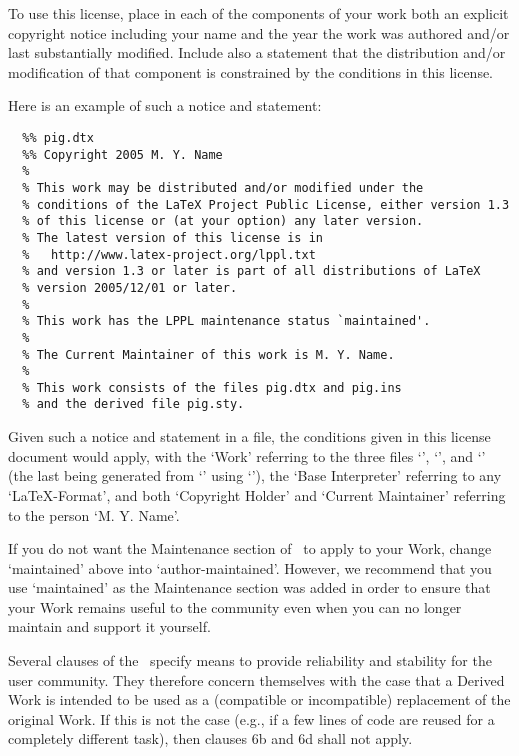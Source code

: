 \begin{LPPLicense}
  \label{LPPL:HowTo}

  To use this license, place in each of the components of your work
  both an explicit copyright notice including your name and the year
  the work was authored and/or last substantially modified.  Include
  also a statement that the distribution and/or modification of that
  component is constrained by the conditions in this license.

  Here is an example of such a notice and statement:
\begin{verbatim}
  %% pig.dtx
  %% Copyright 2005 M. Y. Name
  %
  % This work may be distributed and/or modified under the
  % conditions of the LaTeX Project Public License, either version 1.3
  % of this license or (at your option) any later version.
  % The latest version of this license is in
  %   http://www.latex-project.org/lppl.txt
  % and version 1.3 or later is part of all distributions of LaTeX
  % version 2005/12/01 or later.
  %
  % This work has the LPPL maintenance status `maintained'.
  % 
  % The Current Maintainer of this work is M. Y. Name.
  %
  % This work consists of the files pig.dtx and pig.ins
  % and the derived file pig.sty.
\end{verbatim}
  
  Given such a notice and statement in a file, the conditions given in
  this license document would apply, with the `Work' referring to the
  three files `', `', and
  `' (the last being generated from
  `' using `'), the `Base
  Interpreter' referring to any `\LaTeX-Format', and both `Copyright
  Holder' and `Current Maintainer' referring to the person `M. Y.
  Name'.

  If you do not want the Maintenance section of \LPPL\ to apply to
  your Work, change `maintained' above into `author-maintained'.
  However, we recommend that you use `maintained' as the Maintenance
  section was added in order to ensure that your Work remains useful
  to the community even when you can no longer maintain and support it
  yourself.

  \label{LPPL:NotReplacements}

  Several clauses of the \LPPL\ specify means to provide reliability
  and stability for the user community. They therefore concern
  themselves with the case that a Derived Work is intended to be used
  as a (compatible or incompatible) replacement of the original
  Work. If this is not the case (e.g., if a few lines of code are
  reused for a completely different task), then clauses 6b and 6d
  shall not apply.


\end{LPPLicense}
